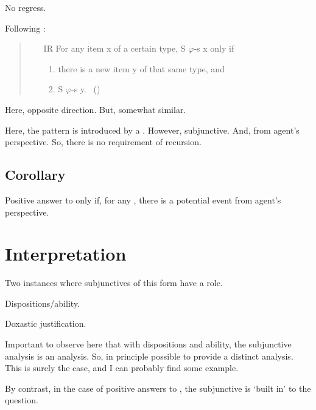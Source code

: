 \begin{note}
  No regress.

  Following \citeauthor{Wieland:2013vf}:

  \begin{quote}
    \begin{itemize}[noitemsep]
    \item[IR]
      For any item x of a certain type, S \(\varphi\)-s x only if
      \begin{enumerate}[label=(\roman*),noitemsep]
      \item
        there is a new item y of that same type, and
      \item
        S \(\varphi\)-s y.%
        \mbox{ }\hfill\mbox{(\citeyear[996]{Wieland:2013vf})}
      \end{enumerate}
    \end{itemize}
  \end{quote}

  Here, opposite direction.
  But, somewhat similar.

  Here, the pattern is introduced by a \requ{}.
  However, subjunctive.
  And, from agent's perspective.
  So, there is no requirement of recursion.
\end{note}

\subsection{Corollary}
\label{cha:zSpA:sec:corollary}

\begin{note}
  \begin{corollary}
    \label{corr:prop:PWEs}
    Positive answer to \qzS{} only if, for any \requ{}, there is a potential event from agent's perspective.
  \end{corollary}
\end{note}

\section{Interpretation}
\label{cha:zSpA:sec:interpretation}

\begin{note}
  Two instances where subjunctives of this form have a role.

  Dispositions/ability.

  Doxastic justification.
\end{note}

\begin{note}
  Important to observe here that with dispositions and ability, the subjunctive analysis is an analysis.
  So, in principle possible to provide a distinct analysis.
  This is surely the case, and I can probably find some example.

  By contrast, in the case of positive answers to \qzS{}, the subjunctive is `built in' to the question.
\end{note}

